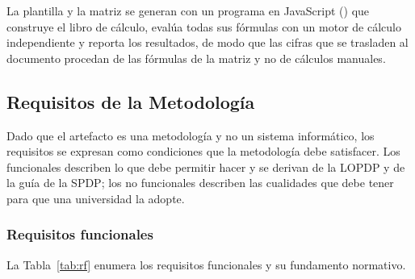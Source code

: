 La plantilla y la matriz se generan con un programa en JavaScript () que construye el libro de cálculo, evalúa todas sus fórmulas con un motor de cálculo independiente y reporta los resultados, de modo que las cifras que se trasladen al documento procedan de las fórmulas de la matriz y no de cálculos manuales.

\subsection{Requisitos de la Metodología}
\label{sec:requisitos_guia}

Dado que el artefacto es una metodología y no un sistema informático, los requisitos se expresan como condiciones que la metodología debe satisfacer. Los funcionales describen lo que debe permitir hacer y se derivan de la LOPDP y de la guía de la SPDP; los no funcionales describen las cualidades que debe tener para que una universidad la adopte.

\subsubsection{Requisitos funcionales}

La Tabla~\ref{tab:rf} enumera los requisitos funcionales y su fundamento normativo.

